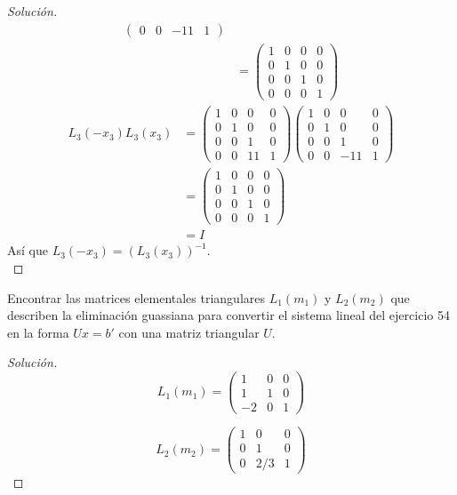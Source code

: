 \documentclass[12pt]{book}
\newenvironment{solucion}
  {\renewcommand\qedsymbol{$\square$}\begin{proof}[Solución]}
  {\end{proof}}
\begin{document}
\begin{solucion}
\begin{align*}
\begin{pmatrix}
    0 & 0 & -11 & 1
    \end{pmatrix}\\[8pt]
    &=\begin{pmatrix}
    1 & 0 & 0 & 0\\
    0 & 1 & 0 & 0\\
    0 & 0 & 1 & 0\\
    0 & 0 & 0 & 1
    \end{pmatrix}
\end{align*}
\begin{align*}
    L_3(-x_3)L_3(x_3)&=\begin{pmatrix}
    1 & 0 & 0 & 0\\
    0 & 1 & 0 & 0\\
    0 & 0 & 1 & 0\\
    0 & 0 & 11 & 1
    \end{pmatrix}\begin{pmatrix}
    1 & 0 & 0 & 0\\
    0 & 1 & 0 & 0\\
    0 & 0 & 1 & 0\\
    0 & 0 & -11 & 1
    \end{pmatrix}\\[8pt]
    &=\begin{pmatrix}
    1 & 0 & 0 & 0\\
    0 & 1 & 0 & 0\\
    0 & 0 & 1 & 0\\
    0 & 0 & 0 & 1
    \end{pmatrix}\\
    &=I
\end{align*}
Así que $L_3(-x_3)=\left(L_3(x_3)\right)^{-1}$.\\
\end{solucion}

\eje Encontrar las matrices elementales triangulares $L_1(m_1)$ y $L_2(m_2)$ que describen la eliminación guassiana para convertir el sistema lineal del ejercicio 54 en la forma $Ux=b'$ con una matriz triangular $U$.

\begin{solucion}
\[L_1(m_1)=\begin{pmatrix}
1 & 0 & 0\\
1 & 1 & 0\\
-2 & 0 & 1
\end{pmatrix}\]

\[L_2(m_2)=\begin{pmatrix}
1 & 0 & 0\\
0 & 1 & 0\\
0 & 2/3 & 1
\end{pmatrix}\]
\end{solucion}
\end{document}
